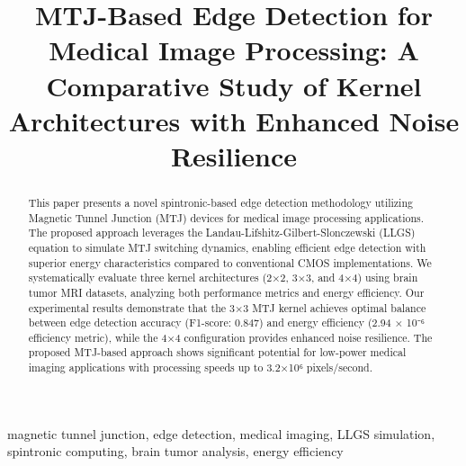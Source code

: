 \documentclass[conference]{IEEEtran}
\begin{document}
\title{MTJ-Based Edge Detection for Medical Image Processing: A Comparative Study of Kernel Architectures with Enhanced Noise Resilience}

\author{
\and
{}
\and
{}
}

\maketitle

\begin{abstract}
This paper presents a novel spintronic-based edge detection methodology utilizing Magnetic Tunnel Junction (MTJ) devices for medical image processing applications. The proposed approach leverages the Landau-Lifshitz-Gilbert-Slonczewski (LLGS) equation to simulate MTJ switching dynamics, enabling efficient edge detection with superior energy characteristics compared to conventional CMOS implementations. We systematically evaluate three kernel architectures (2×2, 3×3, and 4×4) using brain tumor MRI datasets, analyzing both performance metrics and energy efficiency. Our experimental results demonstrate that the 3×3 MTJ kernel achieves optimal balance between edge detection accuracy (F1-score: 0.847) and energy efficiency (2.94 × 10⁻⁶ efficiency metric), while the 4×4 configuration provides enhanced noise resilience. The proposed MTJ-based approach shows significant potential for low-power medical imaging applications with processing speeds up to 3.2×10⁶ pixels/second.
\end{abstract}

\begin{IEEEkeywords}
magnetic tunnel junction, edge detection, medical imaging, LLGS simulation, spintronic computing, brain tumor analysis, energy efficiency
\end{IEEEkeywords}
\end{document}
